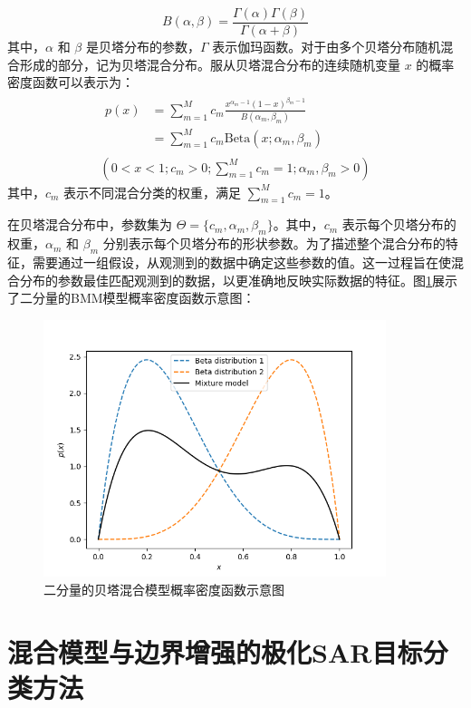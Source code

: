 \begin{equation}
    B(\alpha, \beta) = \frac{\Gamma(\alpha) \Gamma(\beta)}{\Gamma(\alpha + \beta)}
\end{equation}
其中，$\alpha$ 和 $\beta$ 是贝塔分布的参数，$\Gamma$ 表示伽玛函数。对于由多个贝塔分布随机混合形成的部分，记为贝塔混合分布。服从贝塔混合分布的连续随机变量 $x$ 的概率密度函数可以表示为：
\begin{equation}
    \label{eq:beta}
    \begin{gathered}
        \begin{aligned}
            p(x) & = \sum_{m=1}^M c_m \frac{x^{\alpha_m - 1} (1 - x)^{\beta_m - 1}}{B(\alpha_m, \beta_m)} \\
                 & = \sum_{m=1}^M c_m \text{Beta}(x; \alpha_m, \beta_m)
        \end{aligned}
        \\
        (0 < x < 1; c_m > 0; \sum_{m=1}^M c_m = 1; \alpha_m, \beta_m > 0)
    \end{gathered}
\end{equation}
其中，$c_m$ 表示不同混合分类的权重，满足 $\sum_{m=1}^M c_m=1$。

在贝塔混合分布中，参数集为 $\Theta = \{c_m, \alpha_m, \beta_m\}$。其中，$c_m$ 表示每个贝塔分布的权重，$\alpha_m$ 和 $\beta_m$ 分别表示每个贝塔分布的形状参数。为了描述整个混合分布的特征，需要通过一组假设，从观测到的数据中确定这些参数的值。这一过程旨在使混合分布的参数最佳匹配观测到的数据，以更准确地反映实际数据的特征。图\ref{BMM}展示了二分量的BMM模型概率密度函数示意图：
\begin{figure}[ht!]
    \centering
    \includegraphics[width=10cm]{pic/chapter4/BMM.png}
    \caption{二分量的贝塔混合模型概率密度函数示意图}
    \label{BMM}
\end{figure}

\section{混合模型与边界增强的极化SAR目标分类方法}
